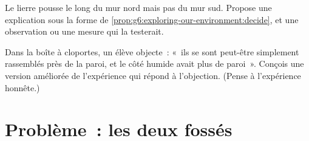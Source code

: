 \begin{exercise}[$\star\star$]\label{exo:g6:exploring-our-environment:11}
Le lierre pousse le long du mur nord mais pas du mur sud. Propose une
explication sous la forme de
\cref{prop:g6:exploring-our-environment:decide}, et une observation
ou une mesure qui la testerait.
\end{exercise}

\begin{exercise}[$\star\star\star$]\label{exo:g6:exploring-our-environment:12}
Dans la boîte à cloportes, un élève objecte~: «~ils se sont peut-être
simplement rassemblés près de la paroi, et le côté humide avait plus
de paroi~». Conçois une version améliorée de l'expérience qui répond
à l'objection. (Pense à l'expérience honnête.)
\end{exercise}

\section{Problème~: les deux fossés}

